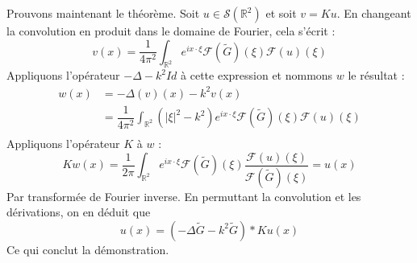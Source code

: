 \documentclass[11pt,a4paper]{article}
\begin{document}
Prouvons maintenant le théorème. Soit $u\in \mathcal{S}(\mathbb{R}^2)$ et soit $v = Ku$. En changeant la convolution en produit dans le domaine de Fourier, cela s'écrit :
\[v(x) = \dfrac{1}{4\pi^2}\int_{\mathbb{R}^2} e^{i x\cdot \xi}\mathcal{F}(\tilde{G})(\xi)\mathcal{F}(u)(\xi)\] 
Appliquons l'opérateur $-\Delta - k^2Id$ à cette expression et nommons $w$ le résultat :
\begin{align*}
w(x) &= -\Delta(v)(x) - k^2 v(x) \\
&= \dfrac{1}{4\pi^2}\int_{\mathbb{R}^2} (|\xi|^2-k^2)e^{i x\cdot \xi}\mathcal{F}(\tilde{G})(\xi)\mathcal{F}(u)(\xi)\\
\end{align*}
Appliquons l'opérateur $K$ à $w$ : 
\[Kw(x) = \dfrac{1}{2\pi} \int_{\mathbb{R}^2}e^{i x\cdot \xi}\mathcal{F}(\tilde{G})(\xi)\dfrac{\mathcal{F}(u)(\xi)}{\mathcal{F}(\tilde{G})(\xi)} = u(x)\]
Par transformée de Fourier inverse. En permuttant la convolution et les dérivations, on en déduit que 
\[ u(x) = (-\Delta \tilde{G} - k^2 \tilde{G}) * Ku (x)\]
Ce qui conclut la démonstration. 
\end{document}
